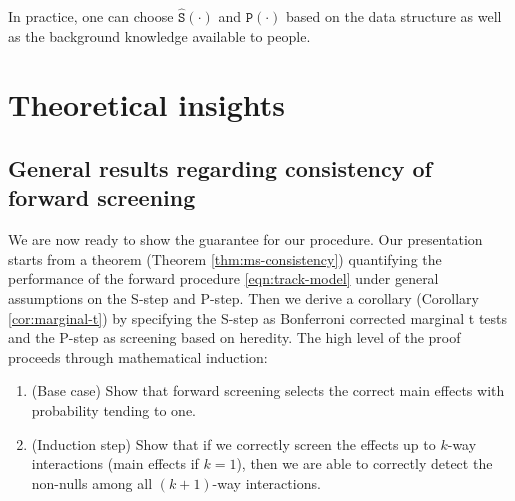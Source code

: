 \documentclass[12pt]{article}
\begin{document}
In practice, one can choose $\hat{\texttt{S}}(\cdot)$ and $\texttt{P}(\cdot)$ based on the data structure as well as the background knowledge available to people. 



\section{Theoretical insights}




\subsection{General results regarding consistency of forward screening}

We are now ready to show the guarantee for our procedure. Our presentation starts from a theorem (Theorem \ref{thm:ms-consistency}) quantifying the performance of the forward procedure \eqref{eqn:track-model} under general assumptions on the S-step and P-step. Then we derive a corollary (Corollary \ref{cor:marginal-t}) by specifying the S-step as Bonferroni corrected marginal t tests and the P-step as screening based on heredity.  The high level of the proof proceeds through mathematical induction:
\begin{enumerate}
    \item (Base case) Show that forward screening selects the correct main effects with probability tending to one.
    
    \item (Induction step) Show that if we correctly screen the effects up to $k$-way interactions (main effects if $k=1$), then we are able to correctly detect the non-nulls among all $(k+1)$-way interactions. 
\end{enumerate}
\end{document}
